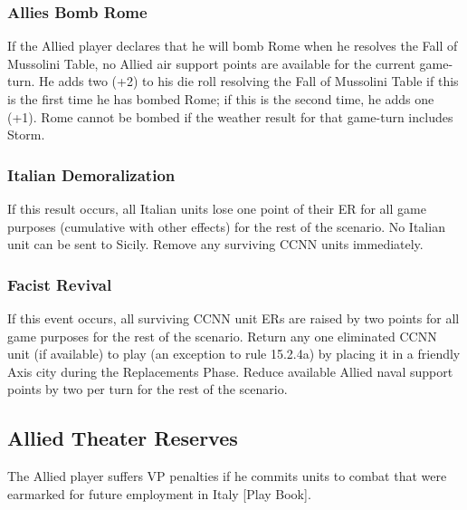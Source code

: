 \subsubsection{Allies Bomb Rome}

If the Allied player declares that he will bomb Rome when he resolves the Fall of Mussolini Table, no Allied air support points are available for the current game-turn. He adds two (+2) to his die roll resolving the Fall of Mussolini Table if this is the first time he has bombed Rome; if this is the second time, he adds one (+1). Rome cannot be bombed if the weather result for that game-turn includes Storm.

\subsubsection{Italian Demoralization}

If this result occurs, all Italian units lose one point of their ER for all game purposes (cumulative with other effects) for the rest of the scenario. No Italian unit can be sent to Sicily. Remove any surviving CCNN units immediately.

\subsubsection{Facist Revival}

If this event occurs, all surviving CCNN unit ERs are raised by two points for all game purposes for the rest of the scenario. Return any one eliminated CCNN unit (if available) to play (an exception to rule 15.2.4a) by placing it in a friendly Axis city during the Replacements Phase. Reduce available Allied naval support points by two per turn for the rest of the scenario.

\subsection{Allied Theater Reserves}

The Allied player suffers VP penalties if he commits units to combat that were earmarked for future employment in Italy [Play Book].